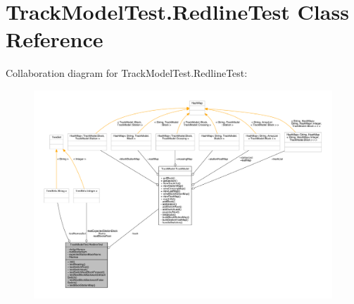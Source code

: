 \hypertarget{classTrackModelTest_1_1RedlineTest}{}\section{Track\+Model\+Test.\+Redline\+Test Class Reference}
\label{classTrackModelTest_1_1RedlineTest}


Collaboration diagram for Track\+Model\+Test.\+Redline\+Test\+:
\nopagebreak
\begin{figure}[H]
\begin{center}
\leavevmode
\includegraphics[width=350pt]{classTrackModelTest_1_1RedlineTest__coll__graph}
\end{center}
\end{figure}
